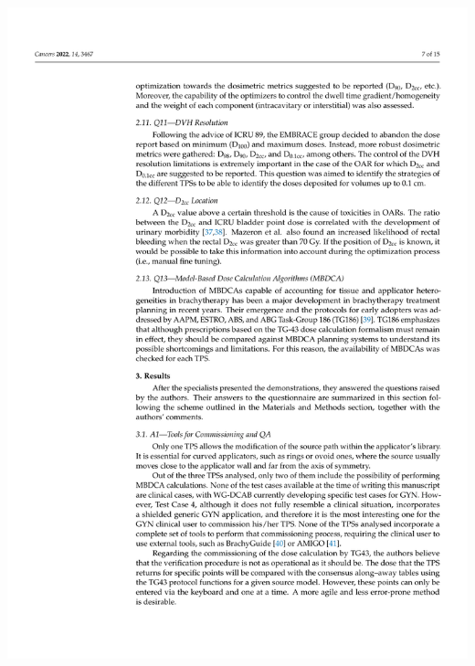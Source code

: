 \documentclass[
  a4paper,
]{scrreprt}
\begin{document}
\includegraphics{articulos/cancers/cancers-07.png}
\end{document}
